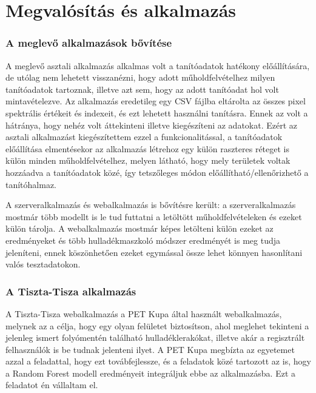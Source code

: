 \chapter{Megvalósítás és alkalmazás}
\label{ch:impl}

\subsection{A meglevő alkalmazások bővítése}
\label{ch:application-improvement}
A meglevő asztali alkalmazás alkalmas volt a tanítóadatok hatékony előállítására, de utólag nem lehetett visszanézni, hogy adott műholdfelvételhez milyen tanítóadatok tartoznak, illetve azt sem, hogy az adott tanítóadat hol volt mintavételezve. Az alkalmazás eredetileg egy CSV fájlba eltárolta az összes pixel spektrális értékeit és indexeit, és ezt lehetett használni tanításra. Ennek az volt a hátránya, hogy nehéz volt áttekinteni illetve kiegészíteni az adatokat. Ezért az asztali alkalmazást kiegészítettem ezzel a funkcionalitással, a tanítóadatok előállítása elmentésekor az alkalmazás létrehoz egy külön raszteres réteget is külön minden műholdfelvételhez, melyen látható, hogy mely területek voltak hozzáadva a tanítóadatok közé, így tetszőleges módon előállítható/ellenőrizhető a tanítóhalmaz.

A szerveralkalmazás és webalkalmazás is bővítésre került: a szerveralkalmazás mostmár több modellt is le tud futtatni a letöltött műholdfelvételeken és ezeket külön tárolja. A webalkalmazás mostmár képes letölteni külön ezeket az eredményeket és több hulladékmaszkoló módszer eredményét is meg tudja jeleníteni, ennek köszönhetően ezeket egymással össze lehet könnyen hasonlítani valós tesztadatokon. 

\subsection{A Tiszta-Tisza alkalmazás}

A Tiszta-Tisza webalkalmazás  a PET Kupa által használt webalkalmazás, melynek az a célja, hogy egy olyan felületet biztosítson, ahol meglehet tekinteni a jelenleg ismert folyómentén található hulladéklerakókat, illetve akár a regisztrált felhasználók is be tudnak jelenteni ilyet. A PET Kupa megbízta az egyetemet azzal a feladattal, hogy ezt továbfejlessze, és a feladatok közé tartozott az is, hogy a Random Forest modell eredményeit integráljuk ebbe az alkalmazásba. Ezt a feladatot én vállaltam el.

